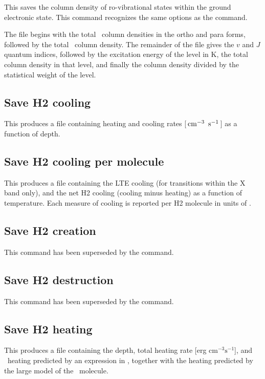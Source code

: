 This saves the column density of ro-vibrational states within the ground
electronic state.  This command recognizes the same options as the  command.

The file begins with the total \htwo\ column densities
in the ortho and para forms, followed by the total \htwo\ column density.  The remainder of the file
gives the $v$ and $J$ quantum indices, followed by the excitation energy of
the level in K, the total column density in that level, and finally the
column density divided by the statistical weight of the level.

\subsection{Save H2 cooling}

This produces a file containing heating and cooling rates
[${\rm\thinspace cm^{-3}}\ \mbox{${\rm\thinspace s}^{-1}\,$}$] as a function of depth.

\subsection{Save H2 cooling per molecule}

This produces a file containing the LTE cooling (for transitions within the X band only),
and the net H2 cooling (cooling minus heating) as a function of temperature.
Each measure of cooling is reported per H2 molecule in units of \ergps.

\subsection{Save H2 creation}

This command has been superseded by the  command.

\subsection{Save H2 destruction}

This command has been superseded by the  command.

\subsection{Save H2 heating}

This produces a file containing the depth, total heating rate [erg
cm$^{-3}\mathrm{s}^{-1}$], and \htwo\ heating predicted by an expression in \citet{Tielens1985a}, together with the heating predicted by the large model of the \htwo\ molecule.

